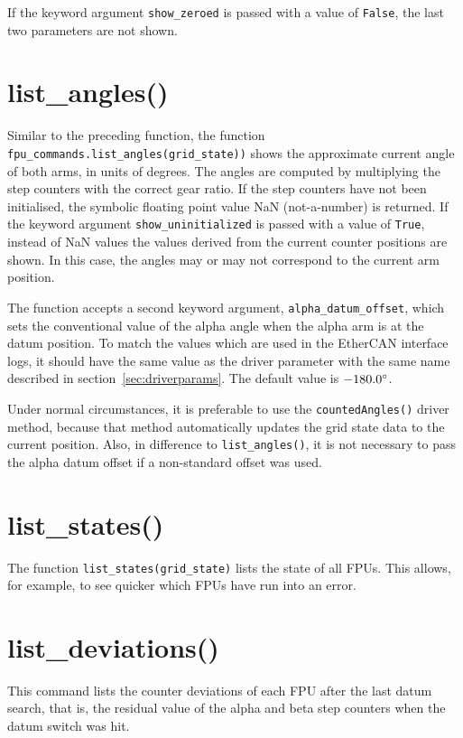 \documentclass[fontsize=12,a4paper]{scrreprt}
\begin{document}
If the keyword argument \texttt{show\_zeroed} is passed with a value of
\texttt{False}, the last two parameters are not shown.

\section{list\_angles()}
\label{sec:listangles}

Similar to the preceding function, the function
\texttt{fpu\_commands.list\_angles(grid\_state))} shows the
approximate current angle of both arms, in units of degrees. The
angles are computed by multiplying the step counters with the correct
gear ratio. If the step counters have not been initialised, the
symbolic floating point value NaN (not-a-number) is returned.  If the
keyword argument \texttt{show\_uninitialized} is passed with a value
of \texttt{True}, instead of NaN values the values derived from the
current counter positions are shown. In this case, the angles may or
may not correspond to the current arm position.

 The function accepts a second keyword
argument, \texttt{alpha\_datum\_offset}, which sets the conventional
value of the alpha angle when the alpha arm is at the datum position.
To match the values which are used in the EtherCAN interface logs, it should have
the same value as the driver parameter with the same name described in
section~\ref{sec:driverparams}. The default value is $-180.0\degree$.

Under normal circumstances, it is preferable to use the
\texttt{countedAngles()} driver method, because that method
automatically updates the grid state data to the current position.
Also, in difference to \texttt{list\_angles()}, it is not necessary
  to pass the alpha datum offset if a non-standard offset was used.

\section{list\_states()}
\label{sec:liststates}

The function \texttt{list\_states(grid\_state)} lists the state of all
FPUs. This allows, for example, to see quicker which FPUs have run into an error.

\section{list\_deviations()}
This command lists the counter deviations of each FPU after the last
datum search, that is, the residual value of the alpha and beta step
counters when the datum switch was hit.
\end{document}
